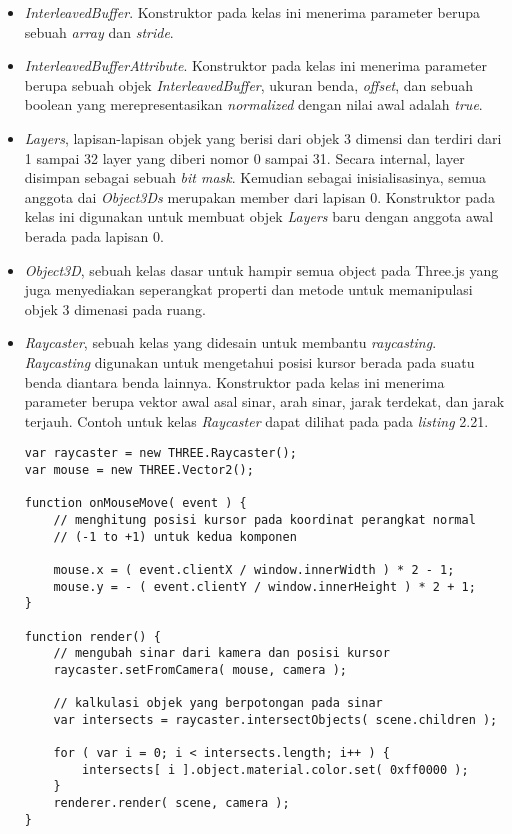 \begin{itemize}
\begin{itemize}
	\item{\it InterleavedBuffer}. Konstruktor pada kelas ini menerima parameter berupa sebuah {\it array} dan {\it stride}.
	
	\item{\it InterleavedBufferAttribute}. Konstruktor pada kelas ini menerima parameter berupa sebuah objek {\it InterleavedBuffer}, ukuran benda, {\it offset}, dan sebuah boolean yang merepresentasikan {\it normalized} dengan nilai awal adalah {\it true}.
	
	\item{\it Layers}, lapisan-lapisan objek yang berisi dari objek 3 dimensi dan terdiri dari 1 sampai 32 layer yang diberi nomor 0 sampai 31. Secara internal, layer disimpan sebagai sebuah {\it bit mask}. Kemudian sebagai inisialisasinya, semua anggota dai {\it Object3Ds} merupakan member dari lapisan 0. Konstruktor pada kelas ini digunakan untuk membuat objek {\it Layers} baru dengan anggota awal berada pada lapisan 0.
	\item{\it Object3D}, sebuah kelas dasar untuk hampir semua object pada Three.js yang juga menyediakan seperangkat properti dan metode untuk memanipulasi objek 3 dimenasi pada ruang.
	\item{\it Raycaster}, sebuah kelas yang didesain untuk membantu {\it raycasting}. {\it Raycasting} digunakan untuk mengetahui posisi kursor berada pada suatu benda diantara benda lainnya. Konstruktor pada kelas ini menerima parameter berupa vektor awal asal sinar, arah sinar, jarak terdekat, dan jarak terjauh. Contoh untuk kelas {\it Raycaster} dapat dilihat pada pada {\it listing} 2.21.
	
\begin{lstlisting}[caption={Contoh penggunaan kelas {\it Raycaster}.},captionpos=b]
var raycaster = new THREE.Raycaster();
var mouse = new THREE.Vector2();

function onMouseMove( event ) {
	// menghitung posisi kursor pada koordinat perangkat normal
	// (-1 to +1) untuk kedua komponen

	mouse.x = ( event.clientX / window.innerWidth ) * 2 - 1;
	mouse.y = - ( event.clientY / window.innerHeight ) * 2 + 1;
}

function render() {
	// mengubah sinar dari kamera dan posisi kursor
	raycaster.setFromCamera( mouse, camera );

	// kalkulasi objek yang berpotongan pada sinar
	var intersects = raycaster.intersectObjects( scene.children );

	for ( var i = 0; i < intersects.length; i++ ) {
		intersects[ i ].object.material.color.set( 0xff0000 );
	}
	renderer.render( scene, camera );
}


\end{lstlisting}
\end{itemize}
\end{itemize}
